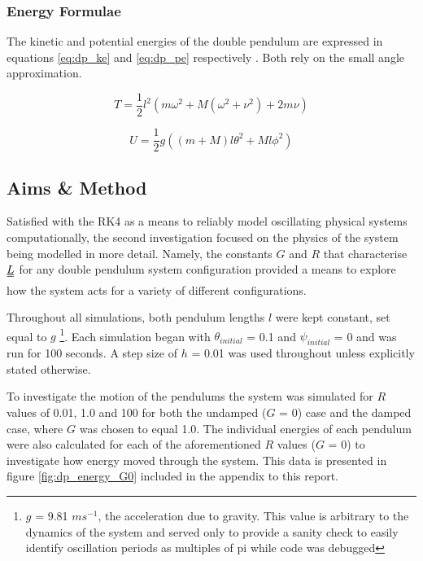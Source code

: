 \documentclass[11pt]{article}
\begin{document}
\subsubsection*{Energy Formulae}
The kinetic and potential energies of the double pendulum are expressed in equations \ref{eq:dp_ke} and \ref{eq:dp_pe} respectively \cite{dp energy formulae}. Both rely on the small angle approximation.

\begin{equation} \label{eq:dp_ke}
T = \frac{1}{2}l^2\left(m\omega^2 + M(\omega^2 + \nu^2) + 2m\nu \right)
\end{equation}

\begin{equation} \label{eq:dp_pe}
U = \frac{1}{2}g\left((m+M)l\theta^2 + Ml\phi^2 \right)
\end{equation}

\subsection{Aims \& Method}
Satisfied with the RK4 as a means to reliably model oscillating physical systems computationally, the second investigation focused on the physics of the system being modelled in more detail. Namely, the constants $G$ and $R$ that characterise $\uuline{L}$ for any double pendulum system configuration provided a means to explore how the system acts for a variety of different configurations.

Throughout all simulations, both pendulum lengths $l$ were kept constant, set equal to $g$ \footnote{$g$ = 9.81 $ms^{-1}$, the acceleration due to gravity. This value is arbitrary to the dynamics of the system and served only to provide a sanity check to easily identify oscillation periods as multiples of pi while code was debugged}. Each simulation began with $\theta_{initial}$ = 0.1 and $\psi_{initial}$ = 0 and was run for 100 seconds. A step size of $h$ = 0.01 was used throughout unless explicitly stated otherwise.

To investigate the motion of the pendulums the system was simulated for $R$ values of 0.01, 1.0 and 100 for both the undamped ($G$ = 0) case and the damped case, where $G$ was chosen to equal 1.0.
%
%
The individual energies of each pendulum were also calculated for each of the aforementioned $R$  values ($G$ = 0) to investigate how energy moved through the system. This data is presented in figure \ref{fig:dp_energy_G0} included in the appendix to this report.
%
%
\end{document}
